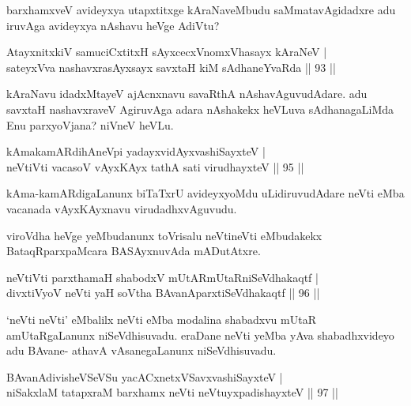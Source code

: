 \begin{artha}
barxhamxveV avideyxya  utapxtitxge kAraNaveMbudu saMmatavAgidadxre adu iruvAga avideyxya nAshavu heVge AdiVtu?
\end{artha}

\begin{shl}
AtayxnitxkiV samuciCxtitxH sAyxcecxVnomxVhasayx kAraNeV |\\
sateyxVva nashavxrasAyxsayx savxtaH kiM sAdhaneYvaRda \hfill || 93 ||
\end{shl}

\begin{artha}
kAraNavu idadxMtayeV ajAcnxnavu savaRthA nAshavAguvudAdare. adu savxtaH nashavxraveV AgiruvAga adara nAshakekx heVLuva sAdhanagaLiMda Enu parxyoVjana? niVneV heVLu.
\end{artha}


\begin{shl}
kAmakamARdihAneV\s pi yadayxvidAyx\s vashiSayxteV |\\
neVtiVti vacasoV vAyxKAyx tathA sati virudhayxteV \hfill || 95 ||
\end{shl}

\begin{artha}
kAma-kamARdigaLanunx biTaTxrU avideyxyoMdu uLidiruvudAdare neVti eMba vacanada vAyxKAyxnavu virudadhxvAguvudu.
\end{artha}

\begin{artha}
viroVdha heVge yeMbudanunx toVrisalu neVtineVti eMbudakekx BataqRparxpaMcara BASAyxnuvAda mADutAtxre.
\end{artha}

\begin{shl}
neVtiVti parxthamaH shabodxV mUtARmUtaRniSeVdhakaqtf |\\
divxtiVyoV neVti yaH soV\s tha BAvanAparxtiSeVdhakaqtf \hfill || 96 ||
\end{shl}

\begin{artha}
`neVti neVti' eMbalilx neVti eMba modalina shabadxvu mUtaR amUtaRgaLanunx niSeVdhisuvadu. eraDane neVti yeMba yAva shabadhxvideyo adu BAvane- athavA vAsanegaLanunx niSeVdhisuvadu.
\end{artha}


\begin{shl}
BAvanAdivisheVSeVSu yacACxnetxVSavxvashiSayxteV |\\
niSakxlaM tatapxraM barxhamx neVti neVtuyxpadishayxteV \hfill || 97 ||
\end{shl}

